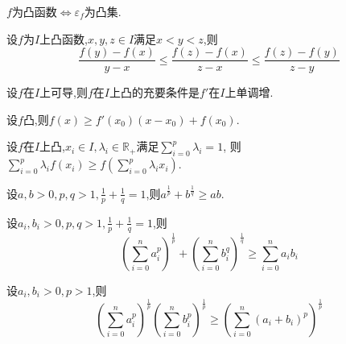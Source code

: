 \begin{prop}
    $f$为凸函数$\Leftrightarrow$$\varepsilon_f$为凸集.
\end{prop}

\begin{prop}
    设$f$为$I$上凸函数,$x,y,z\in I$满足$x<y<z$,则
    \[ \dfrac{f(y)-f(x)}{y-x}\leqslant\dfrac{f(z)-f(x)}{z-x}\leqslant\frac{f(z)-f(y)}{z-y} \]
\end{prop}

\begin{prop}
    设$f$在$I$上可导,则$f$在$I$上凸的充要条件是$f'$在$I$上单调增.
\end{prop}

\begin{prop}
    设$f$凸,则$f(x)\geqslant f'(x_0)(x-x_0)+f(x_0)$.
\end{prop}

\begin{thm}[Jensen不等式]
    设$f$在$I$上凸,$x_i\in I,\lambda_i\in\mathbb{R}_+$满足$\sum\limits_{i=0}^p\lambda_i=1$,
    则$\sum\limits_{i=0}^p\lambda_if(x_i)\geqslant f\left(\sum\limits_{i=0}^p\lambda_ix_i\right)$.
\end{thm}

\begin{thm}[Young不等式]
    设$a,b>0,p,q>1,\frac{1}{p}+\frac{1}{q}=1$,则$a^{\frac{1}{p}}+b^{\frac{1}{q}}\geqslant ab$.
\end{thm}

\begin{thm}[Hölder不等式]
    设$a_i,b_i>0,p,q>1,\frac{1}{p}+\frac{1}{q}=1$,则
    $$\left(\sum\limits_{i=0}^na_i^p\right)^{\frac{1}{p}}+
    \left(\sum\limits_{i=0}^nb_i^q\right)^{\frac{1}{q}}
    \geqslant\sum\limits_{i=0}^na_ib_i$$
\end{thm}

\begin{thm}[Minkowski不等式]
    设$a_i,b_i>0,p>1$,则
    $$\left(\sum\limits_{i=0}^na_i^p\right)^\frac{1}{p}
    \left(\sum\limits_{i=0}^nb_i^p\right)^\frac{1}{p}\geqslant
    \left(\sum\limits_{i=0}^n\left(a_i+b_i\right)^p\right)^\frac{1}{p}$$
\end{thm}